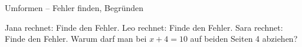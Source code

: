 \begin{aufgabe}{Umformen – Fehler finden, Begründen}
\begin{teile}
\teil Jana rechnet:  Finde den Fehler.
\teil Leo rechnet:  Finde den Fehler.
\teil Sara rechnet:  Finde den Fehler.
\teil Warum darf man bei $x + 4 = 10$ auf beiden Seiten 4 abziehen?
\end{teile}
\end{aufgabe}
